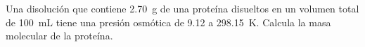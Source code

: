 Una disolución que contiene \SI{2,70}{\gram} de una proteína disueltos en un volumen total de \SI{100}{\milli\liter} tiene una presión osmótica de \SI{9,12}{\torr} a \SI{298,15}{\kelvin}. Calcula la masa molecular de la proteína.
